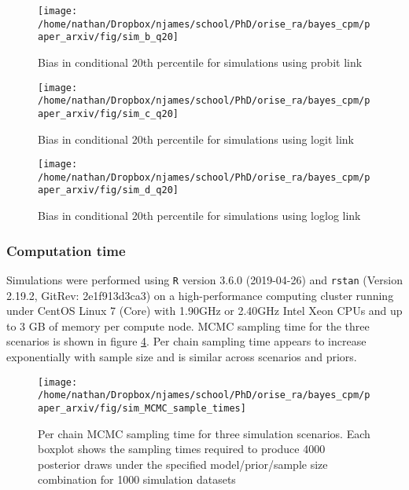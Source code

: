 \documentclass[
]{article}
\begin{document}
\begin{figure}

{\centering \texttt{[image: /home/nathan/Dropbox/njames/school/PhD/orise\_ra/bayes\_cpm/paper\_arxiv/fig/sim\_b\_q20]} 

}

\caption{Bias in conditional 20th percentile for simulations using probit link}\label{fig:simplt-q20-a}
\end{figure}

\begin{figure}

{\centering \texttt{[image: /home/nathan/Dropbox/njames/school/PhD/orise\_ra/bayes\_cpm/paper\_arxiv/fig/sim\_c\_q20]} 

}

\caption{Bias in conditional 20th percentile for simulations using logit link}\label{fig:simplt-q20-b}
\end{figure}

\begin{figure}

{\centering \texttt{[image: /home/nathan/Dropbox/njames/school/PhD/orise\_ra/bayes\_cpm/paper\_arxiv/fig/sim\_d\_q20]} 

}

\caption{Bias in conditional 20th percentile for simulations using loglog link}\label{fig:simplt-q20-c}
\end{figure}

\hypertarget{computation-time}{%
\subsubsection{Computation time}\label{computation-time}}

Simulations were performed using \texttt{R} version 3.6.0 (2019-04-26) and \texttt{rstan} (Version 2.19.2, GitRev: 2e1f913d3ca3) on a high-performance computing cluster running under CentOS Linux 7 (Core) with 1.90GHz or 2.40GHz Intel Xeon CPUs and up to 3 GB of memory per compute node. MCMC sampling time for the three scenarios is shown in figure \ref{fig:simplt-samptime}. Per chain sampling time appears to increase exponentially with sample size and is similar across scenarios and priors.

\begin{figure}

{\centering \texttt{[image: /home/nathan/Dropbox/njames/school/PhD/orise\_ra/bayes\_cpm/paper\_arxiv/fig/sim\_MCMC\_sample\_times]} 

}

\caption{Per chain MCMC sampling time for three simulation scenarios. Each boxplot shows the sampling times required to produce 4000 posterior draws under the specified model/prior/sample size combination for 1000 simulation datasets}\label{fig:simplt-samptime}
\end{figure}
\end{document}
